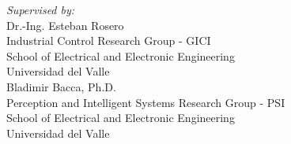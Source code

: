 \begin{titlepage}
\begin{minipage}{.95\linewidth}

\setcounter{page}{3} 

\begin{flushleft}    
 \vspace{10.0cm}
 \textit{Supervised by:}\\
 \vspace{2.5cm}
	Dr.-Ing. Esteban Rosero\\ 
	Industrial Control Research Group - GICI\\
	School of Electrical and Electronic Engineering\\
	Universidad del Valle\\
 \vspace{2.5cm}	
	Bladimir Bacca, Ph.D.\\
	Perception and Intelligent Systems Research Group - PSI\\
	School of Electrical and Electronic Engineering\\
	Universidad del Valle\\
\end{flushleft} 
\end{minipage}
\hfill
\end{titlepage}
